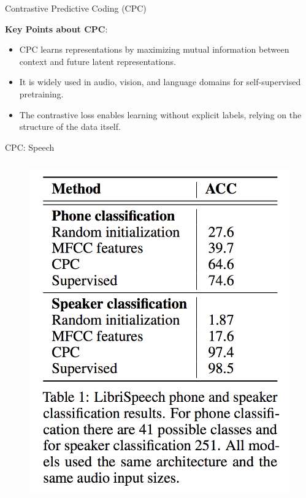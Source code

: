 \begin{frame}[allowframebreaks]{Contrastive Predictive Coding (CPC)}
    \framebreak

    \textbf{Key Points about CPC}:
    \begin{itemize}
        \item CPC learns representations by maximizing mutual information between context and future latent representations.
        \item It is widely used in audio, vision, and language domains for self-supervised pretraining.
        \item The contrastive loss enables learning without explicit labels, relying on the structure of the data itself.
    \end{itemize}
\end{frame}

\begin{frame}[allowframebreaks]{CPC: Speech}
    \begin{columns}
        \begin{figure}
            \centering
            \includegraphics[width=1\linewidth,height=0.9\textheight,keepaspectratio]{images/ssl/slide_52_1_img.png}
        \end{figure}


\end{columns}
\end{frame}
